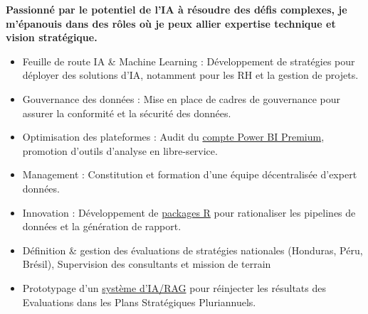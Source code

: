 \documentclass[10pt,a4paper,ragged2e,withhyper]{altacv}
\begin{document}
\begin{paracol}{2}


\textbf{Passionné par le potentiel de l'IA à résoudre des défis complexes, je m'épanouis dans des rôles où je peux allier expertise technique et vision stratégique.}


\begin{itemize}

\item  Feuille de route IA & Machine Learning : Développement de stratégies pour déployer des solutions d'IA, notamment pour les RH et la gestion de projets.

\item  Gouvernance des données : Mise en place de cadres de gouvernance pour assurer la conformité et la sécurité des données.

\item  Optimisation des plateformes : Audit du \href{https://github.com/iom/powerBI_audit}{compte Power BI Premium}, promotion d'outils d'analyse en libre-service.

\item Management : Constitution et formation d'une équipe décentralisée d'expert données.

\item Innovation : Développement de \href{https://github.com/orgs/iom/repositories?q=language%3AR}{packages R} pour rationaliser les pipelines de données et la génération de rapport.


\end{itemize}

\divider

\begin{itemize}
\item Définition \& gestion des évaluations de stratégies nationales (Honduras, Péru, Brésil), Supervision des consultants et mission de terrain
\item Prototypage d'un \href{https://edouard-legoupil.github.io/rag_extraction/}{système d'IA/RAG} pour réinjecter les résultats des Evaluations dans les Plans Stratégiques Pluriannuels.
\end{itemize}


\end{paracol}
\end{document}
